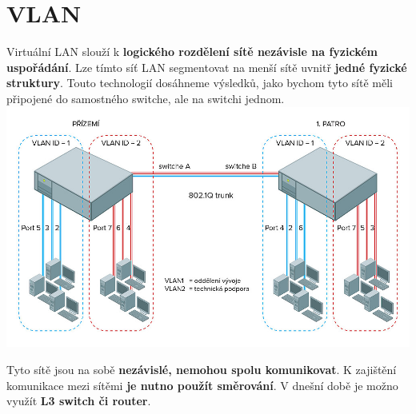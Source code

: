\section{VLAN}
Virtuální LAN slouží k \textbf{logického rozdělení sítě nezávisle na fyzickém uspořádání}.
Lze tímto síť LAN segmentovat na menší sítě uvnitř \textbf{jedné fyzické struktury}.
Touto technologií dosáhneme výsledků, jako bychom tyto sítě měli připojené do samostného switche, ale na switchi jednom. \\
\includegraphics[width=\linewidth]{TVY-POS/VLAN/VLAN.jpg}

Tyto sítě jsou na sobě \textbf{nezávislé, nemohou spolu komunikovat}.
K zajištění komunikace mezi sítěmi \textbf{je nutno použít směrování}.
V dnešní době je možno využít \textbf{L3 switch či router}.

